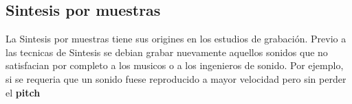 



\subsection{Sintesis por muestras}
La Sintesis por muestras tiene sus origines en los estudios de grabación. Previo a las tecnicas de Sintesis
se debian grabar nuevamente aquellos sonidos que no satisfacian por completo a los musicos o a los ingenieros de sonido.
Por ejemplo, si se requeria que un sonido fuese reproducido a mayor velocidad pero sin perder el \textbf{pitch}




